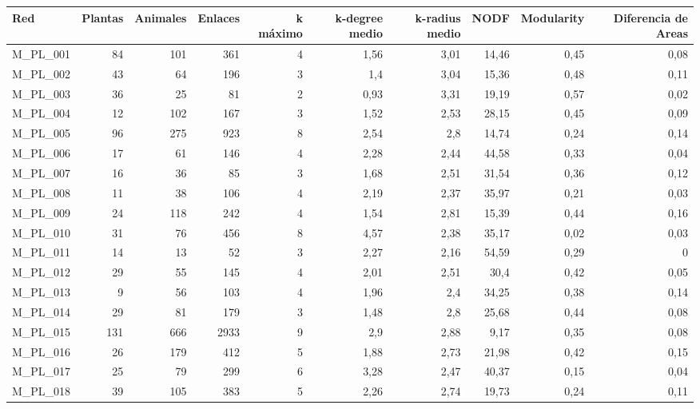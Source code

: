 \documentclass{article}
\begin{document}
\begin{table}[htbp]
\small
  \centering
    \begin{tabular}{lrrrrrrrrr}
    \toprule
    Red  & Plantas & Animales & Enlaces & k máximo & k-degree medio & k-radius medio & NODF & Modularity & Diferencia de Areas \\
    \midrule
    M\_PL\_001 & 84   & 101  & 361  & 4    & 1,56 & 3,01 & 14,46 & 0,45 & 0,08 \\
    M\_PL\_002 & 43   & 64   & 196  & 3    & 1,4  & 3,04 & 15,36 & 0,48 & 0,11 \\
    M\_PL\_003 & 36   & 25   & 81   & 2    & 0,93 & 3,31 & 19,19 & 0,57 & 0,02 \\
    M\_PL\_004 & 12   & 102  & 167  & 3    & 1,52 & 2,53 & 28,15 & 0,45 & 0,09 \\
    M\_PL\_005 & 96   & 275  & 923  & 8    & 2,54 & 2,8  & 14,74 & 0,24 & 0,14 \\
    M\_PL\_006 & 17   & 61   & 146  & 4    & 2,28 & 2,44 & 44,58 & 0,33 & 0,04 \\
    M\_PL\_007 & 16   & 36   & 85   & 3    & 1,68 & 2,51 & 31,54 & 0,36 & 0,12 \\
    M\_PL\_008 & 11   & 38   & 106  & 4    & 2,19 & 2,37 & 35,97 & 0,21 & 0,03 \\
    M\_PL\_009 & 24   & 118  & 242  & 4    & 1,54 & 2,81 & 15,39 & 0,44 & 0,16 \\
    M\_PL\_010 & 31   & 76   & 456  & 8    & 4,57 & 2,38 & 35,17 & 0,02 & 0,03 \\
    M\_PL\_011 & 14   & 13   & 52   & 3    & 2,27 & 2,16 & 54,59 & 0,29 & 0 \\
    M\_PL\_012 & 29   & 55   & 145  & 4    & 2,01 & 2,51 & 30,4 & 0,42 & 0,05 \\
    M\_PL\_013 & 9    & 56   & 103  & 4    & 1,96 & 2,4  & 34,25 & 0,38 & 0,14 \\
    M\_PL\_014 & 29   & 81   & 179  & 3    & 1,48 & 2,8  & 25,68 & 0,44 & 0,08 \\
    M\_PL\_015 & 131  & 666  & 2933 & 9    & 2,9  & 2,88 & 9,17 & 0,35 & 0,08 \\
    M\_PL\_016 & 26   & 179  & 412  & 5    & 1,88 & 2,73 & 21,98 & 0,42 & 0,15 \\
    M\_PL\_017 & 25   & 79   & 299  & 6    & 3,28 & 2,47 & 40,37 & 0,15 & 0,04 \\
    M\_PL\_018 & 39   & 105  & 383  & 5    & 2,26 & 2,74 & 19,73 & 0,24 & 0,11 \\

\end{tabular}
\end{table}
\end{document}
